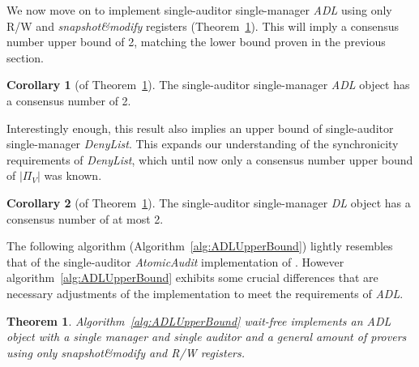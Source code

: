 \documentclass[11pt]{article}
\newtheorem{theorem}{Theorem}
\theoremstyle{definition}
\newtheorem{corollary}{Corollary}
\begin{document}
We now move on to implement single-auditor single-manager \textit{ADL} using only R/W and \textit{snapshot\&modify} registers (Theorem~\ref{thm:ADLUpperBound}). This will imply a consensus number upper bound of 2, matching the lower bound proven in the previous section.

\begin{corollary}[of Theorem~\ref{thm:ADLUpperBound}]
    The single-auditor single-manager \textit{ADL} object has a consensus number of 2.
\end{corollary}

Interestingly enough, this result also implies an upper bound of single-auditor single-manager \textit{DenyList}. This expands our understanding of the synchronicity requirements of \textit{DenyList}, which until now only a consensus number upper bound of $\vert\Pi_V\vert$  was known.

\begin{corollary}[of Theorem~\ref{thm:ADLUpperBound}]
    The single-auditor single-manager \textit{DL} object has a consensus number of at most 2.
\end{corollary}

The following algorithm (Algorithm~\ref{alg:ADLUpperBound}) lightly resembles that of the single-auditor \textit{AtomicAudit} implementation of \cite{AuditableRegs}. However algorithm~\ref{alg:ADLUpperBound} exhibits some crucial differences that are necessary adjustments of the implementation to meet the requirements of \textit{ADL}.
\begin{theorem}
    \label{thm:ADLUpperBound}  
    Algorithm~\ref{alg:ADLUpperBound} wait-free implements an \textit{ADL} object with a single manager and single auditor and a general amount of provers using only \textit{snapshot\&modify} and R/W registers.
\end{theorem}
\end{document}
